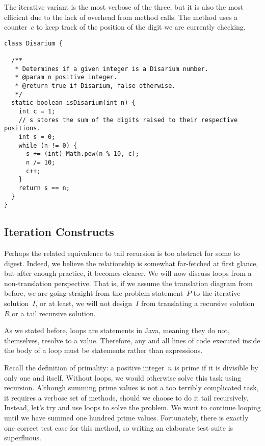 The iterative variant is the most verbose of the three, but it is also the most efficient due to the lack of overhead from method calls.
The method uses a counter~$c$ to keep track of the position of the digit we are currently checking.

\begin{lstlisting}[language=MyJava]
class Disarium {

  /**
   * Determines if a given integer is a Disarium number.
   * @param n positive integer.
   * @return true if Disarium, false otherwise.
   */
  static boolean isDisarium(int n) {
    int c = 1;
    // s stores the sum of the digits raised to their respective positions.
    int s = 0;
    while (n != 0) {
      s += (int) Math.pow(n % 10, c);
      n /= 10;
      c++;
    }
    return s == n;
  }
}
\end{lstlisting}


\subsection{Iteration Constructs}

Perhaps the related equivalence to tail recursion is too abstract for some to digest. 
Indeed, we believe the relationship is somewhat far-fetched at first glance, but after enough practice, it becomes clearer. 
We will now discuss loops from a non-translation perspective. 
That is, if we assume the translation diagram from before, we are going straight from the problem statement~$P$ to the iterative solution~$I$, or at least, we will not design~$I$ from translating a recursive solution~$R$ or a tail recursive solution.

As we stated before, loops are statements in Java, meaning they do not, themselves, resolve to a value. 
Therefore, any and all lines of code executed inside the body of a loop must be statements rather than expressions.

Recall the definition of primality: a positive integer~$n$ is prime if it is divisible by only one and itself. 
Without loops, we would otherwise solve this task using recursion. 
Although summing prime values is not a too terribly complicated task, it requires a verbose set of methods, should we choose to do it tail recursively. 
Instead, let's try and use loops to solve the problem. 
We want to continue looping until we have summed one hundred prime values. 
Fortunately, there is exactly one correct test case for this method, so writing an elaborate test suite is superfluous.

